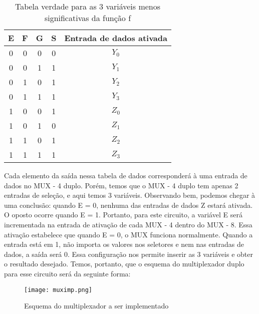 \documentclass[12pt]{article}
\begin{document}
\begin{table}[H]
	\centering
	\begin{tabular}{|c|c|c|c|c|}
		\hline
		\multicolumn{1}{|c}{E}  & \multicolumn{1}{|c|}{F} & \multicolumn{1}{|c|}{G} & \multicolumn{1}{|c|}{S} & \multicolumn{1}{c|}{Entrada de dados ativada}\\
		\hline
		0 & 0 & 0 & 0 & $Y_{0}$\\
		0 & 0 & 1 & 1 & $Y_{1}$\\
		0 & 1 & 0 & 1 & $Y_{2}$\\
		0 & 1 & 1 & 1 & $Y_{3}$\\
		1 & 0 & 0 & 1 & $Z_{0}$\\
		1 & 0 & 1 & 0 & $Z_{1}$\\
		1 & 1 & 0 & 1 & $Z_{2}$\\
		1 & 1 & 1 & 1 & $Z_{3}$\\
		\hline
	\end{tabular}
	\caption{Tabela verdade para as 3 variáveis menos significativas da função f}
	\label{tab:TVF}
\end{table}

Cada elemento da saída nessa tabela de dados corresponderá à uma entrada de dados no MUX - 4 duplo. Porém, temos que o MUX - 4 duplo tem apenas 2 entradas de seleção, e aqui temos 3 variáveis. Observando bem, podemos chegar à uma conclusão: quando E = 0, nenhuma das entradas de dados Z estará ativada. O oposto ocorre quando E = 1. Portanto, para este circuito, a variável E será incrementada na entrada de ativação de cada MUX - 4 dentro do MUX - 8. Essa ativação estabelece que quando E = 0, o MUX funciona normalmente. Quando a entrada está em 1, não importa os valores nos seletores e nem nas entradas de dados, a saída será 0. Essa configuração nos permite inserir as 3 variáveis e obter o resultado desejado. Temos, portanto, que o esquema do multiplexador duplo para esse circuito será da seguinte forma: 

\begin{figure}[H]
	\centering
	\texttt{[image: muximp.png]}
	\caption{Esquema do multiplexador a ser implementado}
	\label{fig:emux}
\end{figure}
\end{document}

